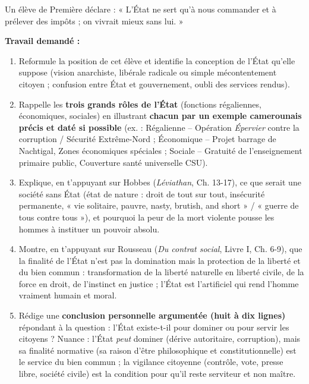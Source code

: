 \documentclass[11pt]{article}
\newcommand{\cle}[1]{{\popxbold\color{popdark}#1}}
\begin{document}
\begin{exercice}
Un élève de Première déclare : « L'État ne sert qu'à nous commander et à prélever des impôts ; on vivrait mieux sans lui. »

\textbf{Travail demandé :}
\begin{enumerate}
\item Reformule la position de cet élève et identifie la conception de l'État qu'elle suppose (vision anarchiste, libérale radicale ou simple mécontentement citoyen ; confusion entre État et gouvernement, oubli des services rendus).
\item Rappelle les \textbf{trois grands rôles de l'État} (fonctions régaliennes, économiques, sociales) en illustrant \textbf{chacun par un exemple camerounais précis et daté si possible} (ex. : Régalienne -- Opération \emph{Épervier} contre la corruption / Sécurité Extrême-Nord ; Économique -- Projet barrage de Nachtigal, Zones économiques spéciales ; Sociale -- Gratuité de l'enseignement primaire public, Couverture santé universelle CSU).
\item Explique, en t'appuyant sur Hobbes (\emph{Léviathan}, Ch. 13-17), ce que serait une société sans État (\cle{état de nature} : droit de tout sur tout, insécurité permanente, « vie solitaire, pauvre, nasty, brutish, and short » / « guerre de tous contre tous »), et pourquoi la peur de la mort violente pousse les hommes à instituer un pouvoir absolu.
\item Montre, en t'appuyant sur Rousseau (\emph{Du contrat social}, Livre I, Ch. 6-9), que la finalité de l'État n'est pas la domination mais la \cle{protection de la liberté et du bien commun} : transformation de la liberté naturelle en liberté civile, de la force en droit, de l'instinct en justice ; l'État est l'artificiel qui rend l'homme vraiment humain et moral.
\item Rédige une \textbf{conclusion personnelle argumentée (huit à dix lignes)} répondant à la question : l'État existe-t-il pour dominer ou pour servir les citoyens ? Nuance : l'État \emph{peut} dominer (dérive autoritaire, corruption), mais sa \cle{finalité normative} (sa raison d'être philosophique et constitutionnelle) est le service du bien commun ; la vigilance citoyenne (contrôle, vote, presse libre, société civile) est la condition pour qu'il reste serviteur et non maître.
\end{enumerate}
\end{exercice}
\end{document}
